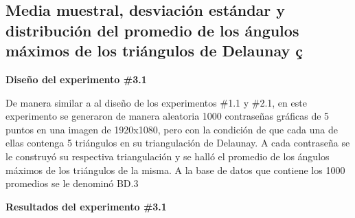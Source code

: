 \documentclass[12pt]{report}
\begin{document}
\subsection{Media muestral, desviación estándar y distribución del promedio de los ángulos máximos de los triángulos de Delaunay  ç}
\textbf{ Diseño del experimento \#3.1}

De manera similar a al diseño de los experimentos \#1.1 y \#2.1, en este experimento se generaron de manera aleatoria 1000 contraseñas gráficas de 5 puntos en una imagen de 1920x1080, pero con la condición de que cada una de ellas contenga 5 triángulos en su triangulación de Delaunay. A cada contraseña se le construyó su respectiva triangulación y se halló el promedio de los ángulos máximos de los triángulos de la misma. A la base de datos que contiene los 1000 promedios se le denominó BD.3



\textbf{Resultados del experimento \#3.1}
\end{document}
